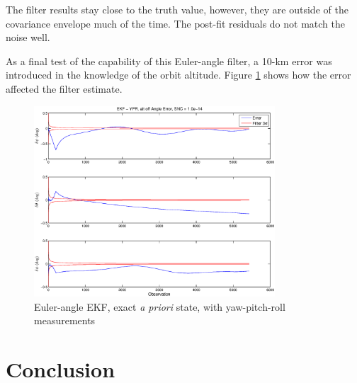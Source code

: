 \documentclass[]{aiaa-tc}%
\begin{document}
The filter results stay close to the truth value, however, they are outside of the covariance envelope much of the time. The post-fit residuals do not match the noise well.

	\vspace{5 mm}

As a final test of the capability of this Euler-angle filter, a 10-km error was introduced in the knowledge of the orbit altitude. Figure \ref{fig:AltOff} shows how the error affected the filter estimate.
	\begin{figure}[H]
		\centering
			\includegraphics[width = 9cm]{../Figures/EKF_AltOff_AngleError.eps}

		\caption{Euler-angle EKF, exact \textit{a priori} state, with yaw-pitch-roll measurements }
		\label{fig:AltOff}
	\end{figure}	


	\section{Conclusion}





%    
    
\end{document}
